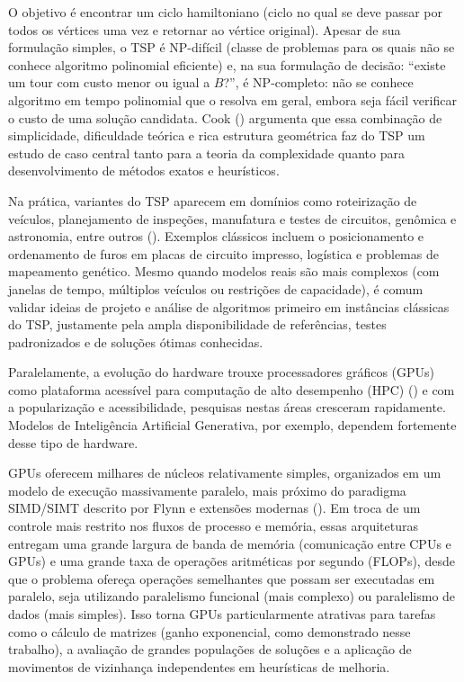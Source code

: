 O objetivo é encontrar um ciclo hamiltoniano (ciclo no qual se deve
passar por todos os vértices uma vez e retornar ao vértice original).
Apesar de sua formulação simples, o TSP é NP-difícil (classe de
problemas para os quais não se conhece algoritmo polinomial eficiente)
e, na sua formulação de decisão: ``existe um tour com custo menor ou
igual a \(B\)?'', é NP-completo: não se conhece algoritmo em tempo
polinomial que o resolva em geral, embora seja fácil verificar o custo
de uma solução candidata. Cook ()
argumenta que essa combinação de simplicidade, dificuldade teórica e
rica estrutura geométrica faz do TSP um estudo de caso central tanto
para a teoria da complexidade quanto para desenvolvimento de métodos
exatos e heurísticos.

Na prática, variantes do TSP aparecem em domínios como roteirização de
veículos, planejamento de inspeções, manufatura e testes de circuitos,
genômica e astronomia, entre outros ().
Exemplos clássicos incluem o posicionamento e ordenamento de furos em
placas de circuito impresso, logística e problemas de mapeamento
genético. Mesmo quando modelos reais são mais complexos (com janelas de
tempo, múltiplos veículos ou restrições de capacidade), é comum validar
ideias de projeto e análise de algoritmos primeiro em instâncias
clássicas do TSP, justamente pela ampla disponibilidade de referências,
testes padronizados e de soluções ótimas conhecidas.

Paralelamente, a evolução do hardware trouxe processadores gráficos
(GPUs) como plataforma acessível para computação de alto desempenho
(HPC) () e com a popularização e
acessibilidade, pesquisas nestas áreas cresceram rapidamente. Modelos de
Inteligência Artificial Generativa, por exemplo, dependem fortemente
desse tipo de hardware.

GPUs oferecem milhares de núcleos relativamente simples, organizados em
um modelo de execução massivamente paralelo, mais próximo do paradigma
SIMD/SIMT descrito por Flynn e extensões modernas
(). Em troca de um controle mais
restrito nos fluxos de processo e memória, essas arquiteturas entregam
uma grande largura de banda de memória (comunicação entre CPUs e GPUs) e
uma grande taxa de operações aritméticas por segundo (FLOPs), desde que
o problema ofereça operações semelhantes que possam ser executadas em
paralelo, seja utilizando paralelismo funcional (mais complexo) ou
paralelismo de dados (mais simples). Isso torna GPUs particularmente
atrativas para tarefas como o cálculo de matrizes (ganho exponencial,
como demonstrado nesse trabalho), a avaliação de grandes populações de
soluções e a aplicação de movimentos de vizinhança independentes em
heurísticas de melhoria.

